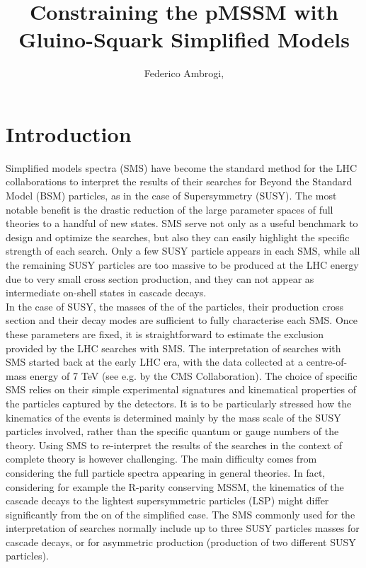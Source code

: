 \documentclass[a4paper,11pt]{article}
\title{{\boldmath Constraining the pMSSM  with \\ Gluino-Squark Simplified Models}}
\author[a,]{Federico Ambrogi,\note{Corresponding author.}}
\affiliation[a]{Department of Meteorology and Geophysics, University of Vienna, Vienna, Austria}
\begin{document}
 
\maketitle
\flushbottom
\section{Introduction}
Simplified models spectra (SMS) have become the standard method for the LHC collaborations to interpret the results of their searches for Beyond the Standard Model (BSM) particles, as in the case of Supersymmetry (SUSY). The most notable benefit is the drastic reduction of the large parameter spaces of full theories to a handful of new states. SMS serve not only as a useful benchmark to design and optimize the searches, but also they can easily highlight the specific strength of each search. Only a few SUSY particle appears in each SMS, while all the remaining SUSY particles are too massive to be produced at the LHC energy due to very small cross section production, and they can not appear as intermediate on-shell states in cascade decays. 
\\
In the case of SUSY, the masses of the of the particles, their production cross section and their decay modes are sufficient to fully characterise each SMS. Once these parameters are fixed, it is straightforward to estimate the exclusion provided by the LHC searches with SMS. The interpretation of searches with SMS started back at the early LHC era, with the data collected at a centre-of-mass energy of 7 TeV (see e.g. \cite{Chatrchyan:2013sza} by the CMS Collaboration). The choice of specific SMS relies on their simple experimental signatures and kinematical properties of the particles captured by the detectors. It is to be particularly stressed how the kinematics of the events is determined mainly by the mass scale of the SUSY particles involved, rather than the specific quantum or gauge numbers of the theory. Using SMS to re-interpret the results  of  the searches in the context of complete theory is however challenging. The main difficulty comes from considering the full particle spectra appearing in general theories. In fact, considering for example the R-parity conserving MSSM, the kinematics of the cascade decays to the lightest supersymmetric particles (LSP) might differ significantly from the on of the simplified case. The SMS commonly used for the interpretation of searches normally include up to three SUSY particles masses for cascade decays, or for asymmetric production (production of two different SUSY particles).
\end{document}
